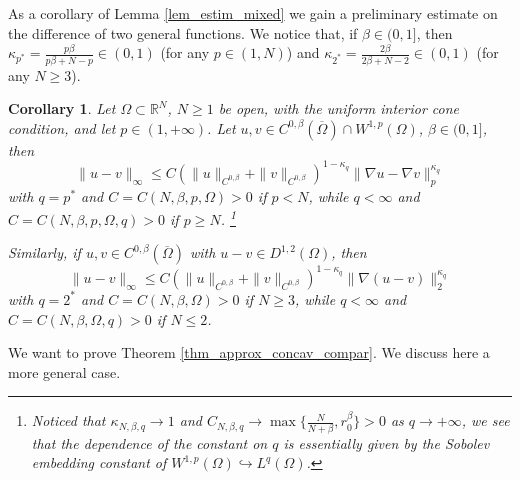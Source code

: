 \documentclass[11pt, reqno]{amsart}
\newtheorem{corollary}[lemma]{Corollary}
\theoremstyle{definition}
\numberwithin{equation}{section}
\newcommand{\R}{\mathbb{R}}
\def\norm#1{\|#1\|}
\begin{document}
As a corollary of Lemma \ref{lem_estim_mixed} we gain a preliminary estimate on the difference of two general functions. 
We notice that, if $\beta \in (0,1]$, then $\kappa_{p^*} = \tfrac{p\beta }{p\beta + N-p} \in (0,1)$ (for any $p \in (1,N)$) and $\kappa_{2^*} = \tfrac{2\beta }{2\beta + N-2} \in (0,1)$ (for any $N \geq 3$).
\begin{corollary}
Let $\Omega \subset \R^N$, $N \geq 1$ be open, with the uniform interior cone condition, and let $p \in (1,+\infty)$. 
Let $u,v \in C^{0,\beta}(\overline{\Omega}) \cap W^{1,p}(\Omega)$, $\beta \in (0,1]$, then 
\begin{equation}\label{eq_stima_unif_diff_p}
\norm{u-v}_{\infty}\leq C \left(\norm{u}_{C^{0,\beta}}+\norm{v}_{C^{0,\beta}}\right)^{1-\kappa_{q}} \norm{\nabla u-\nabla v}_{p}^{\kappa_{q}}
\end{equation}
with $q=p^*$ and $C=C(N,\beta,p, \Omega)>0$ if $p<N$, while $q<\infty$ and $C=C(N,\beta, p, \Omega, q)>0$ if $p\geq N$.%
\footnote{Noticed that $\kappa_{N,\beta,q} \to 1$ and $C_{N,\beta,q} \to \max\big\{\frac{N}{N+\beta}, r_0^{\beta}\big\} >0$ as $q \to +\infty$, we see that the dependence of the constant on $q$ is essentially given by the Sobolev embedding constant of $W^{1,p}(\Omega) \hookrightarrow L^q(\Omega)$.}

Similarly, if $u,v \in C^{0,\beta}(\overline{\Omega})$ with $u-v \in D^{1,2}(\Omega)$, then 
\begin{equation}\label{eq_stima_unif_diff_2}
\norm{u-v}_{\infty}\leq C \left(\norm{u}_{C^{0,\beta}}+\norm{v}_{C^{0,\beta}}\right)^{1-\kappa_{q}} \norm{\nabla(u-v)}_{2}^{\kappa_{q}}
\end{equation}
with $q=2^*$ and $C=C(N,\beta, \Omega)>0$ if $N\geq 3$, while $q <\infty$ and $C=C(N,\beta, \Omega, q)>0$ if $N\leq 2$.
\end{corollary}


We want to prove Theorem \ref{thm_approx_concav_compar}. We discuss here a more general case.
\end{document}

